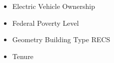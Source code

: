 \begin{itemize}
\item Electric Vehicle Ownership
\item Federal Poverty Level
\item Geometry Building Type RECS
\item Tenure
\end{itemize}
